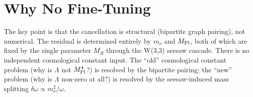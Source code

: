 \documentclass[12pt]{article}
\begin{document}
\section{Why No Fine-Tuning}

The key point is that the cancellation is structural (bipartite graph pairing),
not numerical. The residual is determined entirely by $m_\nu$ and $M_{\rm Pl}$,
both of which are fixed by the single parameter $M_R$ through the W(3,3)
seesaw cascade. There is no independent cosmological constant input. The
``old'' cosmological constant problem (why is $\Lambda$ not $M_{\rm Pl}^4$?)
is resolved by the bipartite pairing; the ``new'' problem (why is $\Lambda$
non-zero at all?) is resolved by the seesaw-induced mass splitting $\delta\omega
\propto m_\nu^2/\omega$.
\end{document}
